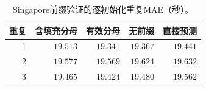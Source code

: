 \begin{table}[t]
\centering\footnotesize\setlength{\tabcolsep}{4pt}
\caption{Singapore前缀验证的逐初始化重复MAE（秒）。}\label{tab:prefix_seeds}
\begin{tabular}{rrrrr}\toprule
重复 & 含填充分母 & 有效分母 & 无前缀 & 直接预测\\\midrule
1 & $19.513$ & $19.341$ & $19.367$ & $19.441$\\
2 & $19.577$ & $19.569$ & $19.624$ & $19.632$\\
3 & $19.465$ & $19.424$ & $19.480$ & $19.562$\\
\bottomrule\end{tabular}
\end{table}
